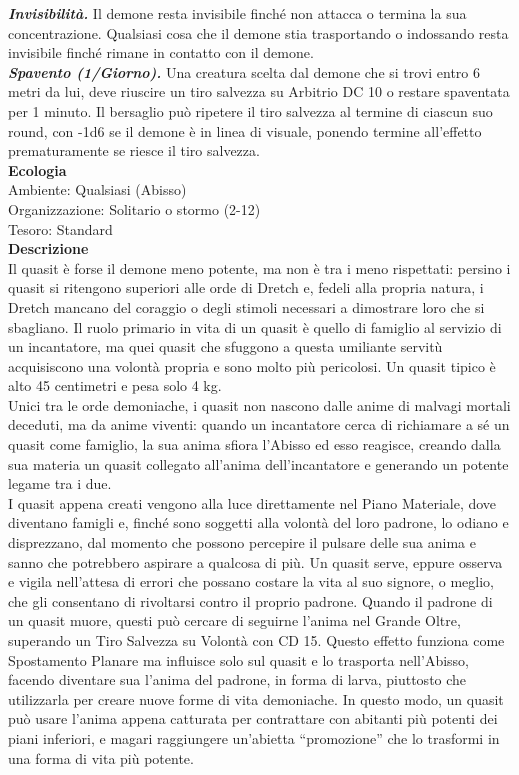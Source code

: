 \begin{multicols}{2}
\emph{\textbf{Invisibilità.}} Il demone resta invisibile finché non attacca o termina la sua concentrazione. Qualsiasi cosa che il demone stia trasportando o indossando resta invisibile finché rimane in contatto con il demone.\\
\emph{\textbf{Spavento (1/Giorno).}} Una creatura scelta dal demone che si trovi entro 6 metri da lui, deve riuscire un tiro salvezza su Arbitrio DC 10 o restare spaventata per 1 minuto. Il bersaglio può ripetere il tiro salvezza al termine di ciascun suo round, con -1d6 se il demone è in linea di visuale, ponendo termine all'effetto prematuramente se riesce il tiro salvezza.\\
\textbf{Ecologia}\\
Ambiente: Qualsiasi (Abisso)\\
Organizzazione: Solitario o stormo (2-12)\\
Tesoro: Standard\\
\textbf{Descrizione}\\
Il quasit è forse il demone meno potente, ma non è tra i meno rispettati: persino i quasit si ritengono superiori alle orde di Dretch e, fedeli alla propria natura, i Dretch mancano del coraggio o degli stimoli necessari a dimostrare loro che si sbagliano. Il ruolo primario in vita di un quasit è quello di famiglio al servizio di un incantatore, ma quei quasit che sfuggono a questa umiliante servitù acquisiscono una volontà propria e sono molto più pericolosi. Un quasit tipico è alto 45 centimetri e pesa solo 4 kg.\\
Unici tra le orde demoniache, i quasit non nascono dalle anime di malvagi mortali deceduti, ma da anime viventi: quando un incantatore cerca di richiamare a sé un quasit come famiglio, la sua anima sfiora l'Abisso ed esso reagisce, creando dalla sua materia un quasit collegato all'anima dell'incantatore e generando un potente legame tra i due.\\
I quasit appena creati vengono alla luce direttamente nel Piano Materiale, dove diventano famigli e, finché sono soggetti alla volontà del loro padrone, lo odiano e disprezzano, dal momento che possono percepire il pulsare delle sua anima e sanno che potrebbero aspirare a qualcosa di più. Un quasit serve, eppure osserva e vigila nell'attesa di errori che possano costare la vita al suo signore, o meglio, che gli consentano di rivoltarsi contro il proprio padrone. Quando il padrone di un quasit muore, questi può cercare di seguirne l'anima nel Grande Oltre, superando un Tiro Salvezza su Volontà con CD 15. Questo effetto funziona come Spostamento Planare ma influisce solo sul quasit e lo trasporta nell'Abisso, facendo diventare sua l'anima del padrone, in forma di larva, piuttosto che utilizzarla per creare nuove forme di vita demoniache. In questo modo, un quasit può usare l'anima appena catturata per contrattare con abitanti più potenti dei piani inferiori, e magari raggiungere un'abietta “promozione” che lo trasformi in una forma di vita più potente.\\

\end{multicols}
